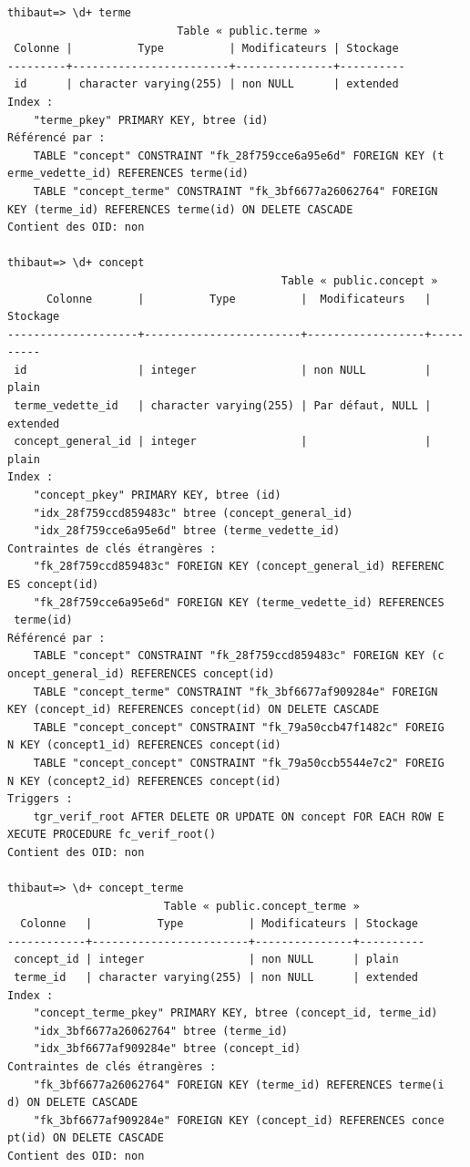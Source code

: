 \begin{verbatim}
thibaut=> \d+ terme
                          Table « public.terme »
 Colonne |          Type          | Modificateurs | Stockage 
---------+------------------------+---------------+----------
 id      | character varying(255) | non NULL      | extended  
Index :
    "terme_pkey" PRIMARY KEY, btree (id)
Référencé par :
    TABLE "concept" CONSTRAINT "fk_28f759cce6a95e6d" FOREIGN KEY (t
erme_vedette_id) REFERENCES terme(id)
    TABLE "concept_terme" CONSTRAINT "fk_3bf6677a26062764" FOREIGN 
KEY (terme_id) REFERENCES terme(id) ON DELETE CASCADE
Contient des OID: non

thibaut=> \d+ concept
                                          Table « public.concept »
      Colonne       |          Type          |  Modificateurs   | Stockage  
--------------------+------------------------+------------------+----------
 id                 | integer                | non NULL         | plain    
 terme_vedette_id   | character varying(255) | Par défaut, NULL | extended
 concept_general_id | integer                |                  | plain     
Index :
    "concept_pkey" PRIMARY KEY, btree (id)
    "idx_28f759ccd859483c" btree (concept_general_id)
    "idx_28f759cce6a95e6d" btree (terme_vedette_id)
Contraintes de clés étrangères :
    "fk_28f759ccd859483c" FOREIGN KEY (concept_general_id) REFERENC
ES concept(id)
    "fk_28f759cce6a95e6d" FOREIGN KEY (terme_vedette_id) REFERENCES
 terme(id)
Référencé par :
    TABLE "concept" CONSTRAINT "fk_28f759ccd859483c" FOREIGN KEY (c
oncept_general_id) REFERENCES concept(id)
    TABLE "concept_terme" CONSTRAINT "fk_3bf6677af909284e" FOREIGN 
KEY (concept_id) REFERENCES concept(id) ON DELETE CASCADE
    TABLE "concept_concept" CONSTRAINT "fk_79a50ccb47f1482c" FOREIG
N KEY (concept1_id) REFERENCES concept(id)
    TABLE "concept_concept" CONSTRAINT "fk_79a50ccb5544e7c2" FOREIG
N KEY (concept2_id) REFERENCES concept(id)
Triggers :
    tgr_verif_root AFTER DELETE OR UPDATE ON concept FOR EACH ROW E
XECUTE PROCEDURE fc_verif_root()
Contient des OID: non

thibaut=> \d+ concept_terme
                        Table « public.concept_terme »
  Colonne   |          Type          | Modificateurs | Stockage 
------------+------------------------+---------------+----------
 concept_id | integer                | non NULL      | plain     
 terme_id   | character varying(255) | non NULL      | extended  
Index :
    "concept_terme_pkey" PRIMARY KEY, btree (concept_id, terme_id)
    "idx_3bf6677a26062764" btree (terme_id)
    "idx_3bf6677af909284e" btree (concept_id)
Contraintes de clés étrangères :
    "fk_3bf6677a26062764" FOREIGN KEY (terme_id) REFERENCES terme(i
d) ON DELETE CASCADE
    "fk_3bf6677af909284e" FOREIGN KEY (concept_id) REFERENCES conce
pt(id) ON DELETE CASCADE
Contient des OID: non


\end{verbatim}
